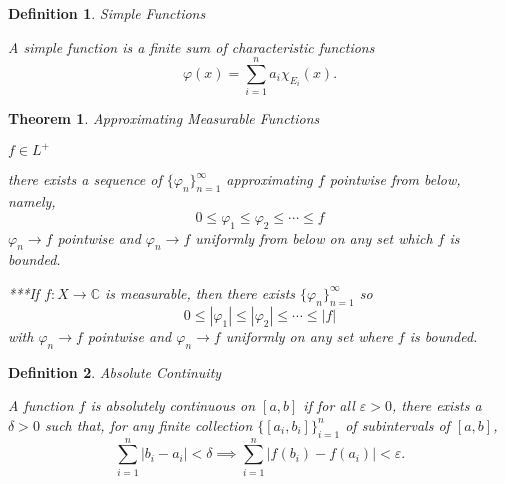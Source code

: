 \documentclass[12pt]{Qual}
\newtheorem{theorem}{Theorem}
\newtheorem{definition}{Definition}
\begin{document}
\vspace{0.5cm}
\begin{definition}{\Large\textit{Simple Functions}}
$\,$

A simple function is a finite sum of characteristic functions $$\varphi(x)=\sum_{i=1}^na_i\chi_{E_i}(x).$$

\end{definition}
\vspace{0.5cm}
\begin{theorem}{\Large\textit{Approximating Measurable Functions}}

 $f\in L^+$
\vspace{-1.5cm}

 \hspace{0.1cm}\begin{minipage}{0.85\textwidth}
\vspace{2cm}
there exists a sequence of $\{\varphi_n\}_{n=1}^\infty$ approximating $f$ pointwise from below, namely, $$0\le\varphi_1\le\varphi_2\le\cdots\le f$$ $\varphi_n\to f$ pointwise and $\varphi_n\to f$ uniformly from below on any set which $f$ is bounded.
\end{minipage}

\begin{mybox}
***If $f:X\to\mathbb{C}$ is measurable, then there exists $\{\varphi_n\}_{n=1}^\infty$ so $$0\le|\varphi_1|\le|\varphi_2|\le\cdots\le|f|$$ with $\varphi_n\to f$ pointwise and $\varphi_n\to f$ uniformly on any set where $f$ is bounded.
\end{mybox}

\end{theorem}
\begin{definition}{\Large\textit{Absolute Continuity}}
$\,$

A function $f$ is absolutely continuous on $[a,b]$ if for all $\varepsilon>0$, there exists a $\delta>0$ such that, for any finite collection $\{[a_i,b_i]\}_{i=1}^n$ of subintervals of $[a,b]$, $$\sum_{i=1}^n|b_i-a_i|<\delta\implies \sum_{i=1}^n|f(b_i)-f(a_i)|<\varepsilon.$$

\end{definition}
\vspace{0.25cm}
\end{document}
